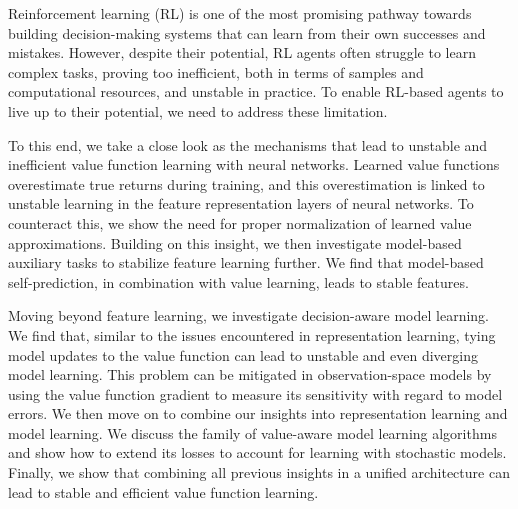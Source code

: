 Reinforcement learning (RL) is one of the most promising pathway towards building decision-making systems that can learn from their own successes and mistakes.
However, despite their potential, RL agents often struggle to learn complex tasks, proving too inefficient, both in terms of samples and computational resources, and unstable in practice.
To enable RL-based agents to live up to their potential, we need to address these limitation.

To this end, we take a close look as the mechanisms that lead to unstable and inefficient value function learning with neural networks.
Learned value functions overestimate true returns during training, and this overestimation is linked to unstable learning in the feature representation layers of neural networks.
To counteract this, we show the need for proper normalization of learned value approximations.
Building on this insight, we then investigate model-based auxiliary tasks to stabilize feature learning further.
We find that model-based self-prediction, in combination with value learning, leads to stable features.

Moving beyond feature learning, we investigate decision-aware model learning.
We find that, similar to the issues encountered in representation learning, tying model updates to the value function can lead to unstable and even diverging model learning.
This problem can be mitigated in observation-space models by using the value function gradient to measure its sensitivity with regard to model errors.
We then move on to combine our insights into representation learning and model learning.
We discuss the family of value-aware model learning algorithms and show how to extend its losses to account for learning with stochastic models.
Finally, we show that combining all previous insights in a unified architecture can lead to stable and efficient value function learning.